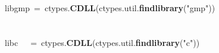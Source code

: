 \documentclass{article}\usepackage[]{graphicx}\usepackage[dvipsnames,table]{xcolor}
\makeatletter
\newcommand{\hlsng}[1]{\textcolor[rgb]{0.192,0.494,0.8}{#1}}%
\newcommand{\hlopt}[1]{\textcolor[rgb]{0,0,0}{#1}}%
\newcommand{\hldef}[1]{\textcolor[rgb]{0.345,0.345,0.345}{#1}}%
\newcommand{\hlkwd}[1]{\textcolor[rgb]{0.737,0.353,0.396}{\textbf{#1}}}%
\newenvironment{kframe}{%
 \def\at@end@of@kframe{}%
 \ifinner\ifhmode%
  \def\at@end@of@kframe{\end{minipage}}%
  \begin{minipage}{\columnwidth}%
 \fi\fi%
 \def\FrameCommand##1{\hskip\@totalleftmargin \hskip-\fboxsep
 \colorbox{shadecolor}{##1}\hskip-\fboxsep
     \hskip-\linewidth \hskip-\@totalleftmargin \hskip\columnwidth}%
 \MakeFramed {\advance\hsize-\width
   \@totalleftmargin\z@ \linewidth\hsize
   \@setminipage}}%
 {\par\unskip\endMakeFramed%
 \at@end@of@kframe}
\newenvironment{knitrout}{}{} %
\makeatother
\begin{document}
\begin{center}
\begin{minipage}[m]{15cm}
\begin{knitrout}
\begin{kframe}
\hldef{\textunderscore libgmp\ }\hlopt{=\ }\hldef{ctypes}\hlopt{.}\hldef{}\hlkwd{CDLL}\hldef{}\hlopt{(}\hldef{ctypes}\hlopt{.}\hldef{util}\hlopt{.}\hldef{}\hlkwd{find\textunderscore library}\hldef{}\hlopt{(}\hldef{}\hlsng{"gmp"}\hldef{}\hlopt{))}\hspace*{\fill}\\
\hldef{}\hspace*{\fill}\\
\hldef{}\hspace*{\fill}\\
\hldef{\textunderscore libc}\hldef{\ \ \ }\hldef{}\hlopt{=\ }\hldef{ctypes}\hlopt{.}\hldef{}\hlkwd{CDLL}\hldef{}\hlopt{(}\hldef{ctypes}\hlopt{.}\hldef{util}\hlopt{.}\hldef{}\hlkwd{find\textunderscore library}\hldef{}\hlopt{(}\hldef{}\hlsng{"c"}\hldef{}\hlopt{))}\hldef{}\hspace*{\fill}
\mbox{}
\normalfont
\end{kframe}
\end{knitrout}
\end{minipage}
\end{center}

\newpage
\end{document}
